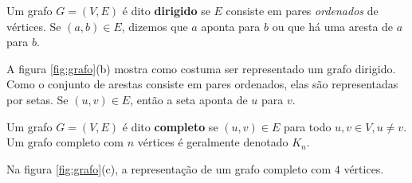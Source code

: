 \begin{definition}
  Um grafo $G = (V, E)$ é dito \textbf{dirigido} se $E$ consiste em pares \emph{ordenados} de vértices. Se $(a, b) \in E$, dizemos que $a$ aponta para $b$ ou que há uma aresta de $a$ para $b$.

  A figura \ref{fig:grafo}(b) mostra como costuma ser representado um grafo dirigido. Como o conjunto de arestas consiste em pares ordenados, elas são representadas por setas. Se $(u, v) \in E$, então a seta aponta de $u$ para $v$.
\end{definition}

\begin{definition}
  Um grafo $G = (V, E)$ é dito \textbf{completo} se $(u, v) \in E$ para todo $u, v \in V, u \neq v$. Um grafo completo com $n$ vértices é geralmente denotado $K_n$.

  Na figura \ref{fig:grafo}(c), a representação de um grafo completo com $4$ vértices.
\end{definition}

